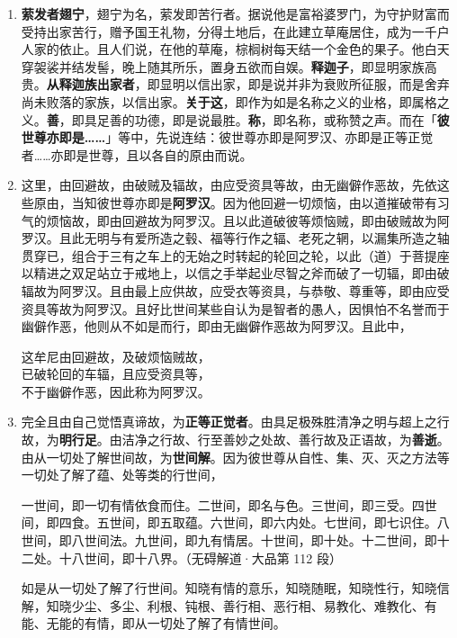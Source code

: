\begin{enumerate}\item \textbf{萦发者翅宁}，翅宁为名，萦发即苦行者。据说他是富裕婆罗门，为守护财富而受持出家苦行，赠予国王礼物，分得土地后，在此建立草庵居住，成为一千户人家的依止。且人们说，在他的草庵，棕榈树每天结一个金色的果子。他白天穿袈裟并结发髻，晚上随其所乐，置身五欲而自娱。\textbf{释迦子}，即显明家族高贵。\textbf{从释迦族出家者}，即显明以信出家，即是说并非为衰败所征服，而是舍弃尚未败落的家族，以信出家。\textbf{关于这}，即作为如是名称之义的业格，即属格之义。\textbf{善}，即具足善的功德，即是说最胜。\textbf{称}，即名称，或称赞之声。而在「\textbf{彼世尊亦即是……}」等中，先说连结：彼世尊亦即是阿罗汉、亦即是正等正觉者……亦即是世尊，且以各自的原由而说。
\item 这里，由回避故，由破贼及辐故，由应受资具等故，由无幽僻作恶故，先依这些原由，当知彼世尊亦即是\textbf{阿罗汉}。因为他回避一切烦恼，由以道摧破带有习气的烦恼故，即由回避故为阿罗汉。且以此道破彼等烦恼贼，即由破贼故为阿罗汉。且此无明与有爱所造之毂、福等行作之辐、老死之辋，以漏集所造之轴贯穿已，组合于三有之车上的无始之时转起的轮回之轮，以此（道）于菩提座以精进之双足站立于戒地上，以信之手举起业尽智之斧而破了一切辐，即由破辐故为阿罗汉。且由最上应供故，应受衣等资具，与恭敬、尊重等，即由应受资具等故为阿罗汉。且好比世间某些自认为是智者的愚人，因惧怕不名誉而于幽僻作恶，他则从不如是而行，即由无幽僻作恶故为阿罗汉。且此中，\begin{quoting}这牟尼由回避故，及破烦恼贼故，\\已破轮回的车辐，且应受资具等，\\不于幽僻作恶，因此称为阿罗汉。\end{quoting}
\item 完全且由自己觉悟真谛故，为\textbf{正等正觉者}。由具足极殊胜清净之明与超上之行故，为\textbf{明行足}。由洁净之行故、行至善妙之处故、善行故及正语故，为\textbf{善逝}。由从一切处了解世间故，为\textbf{世间解}。因为彼世尊从自性、集、灭、灭之方法等一切处了解了蕴、处等类的行世间，\begin{quoting}一世间，即一切有情依食而住。二世间，即名与色。三世间，即三受。四世间，即四食。五世间，即五取蕴。六世间，即六内处。七世间，即七识住。八世间，即八世间法。九世间，即九有情居。十世间，即十处。十二世间，即十二处。十八世间，即十八界。（无碍解道·大品第 112 段）\end{quoting}如是从一切处了解了行世间。知晓有情的意乐，知晓随眠，知晓性行，知晓信解，知晓少尘、多尘、利根、钝根、善行相、恶行相、易教化、难教化、有能、无能的有情，即从一切处了解了有情世间。

\end{enumerate}
